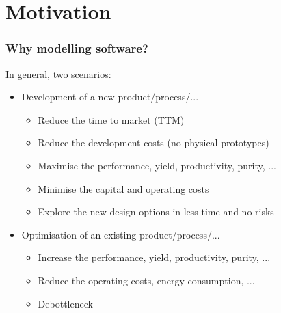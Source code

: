 \documentclass[compress,newPxFont,sthlmFooter]{beamer}
\begin{document}
\section{Motivation}

\begin{frame}
\frametitle{Why modelling software?}
In general, two scenarios:
\begin{itemize}
  \item \alert{Development} of a \alert{new} product/process/...
    \begin{itemize}
        \item Reduce the time to market (TTM)
        \item Reduce the development costs (no physical prototypes)
        \item Maximise the performance, yield, productivity, purity, ...
        \item Minimise the capital and operating costs
        \item Explore the new design options in less time and no risks
    \end{itemize}

  \item \alert{Optimisation} of an \alert{existing} product/process/...
    \begin{itemize}
        \item Increase the performance, yield, productivity, purity, ...
        \item Reduce the operating costs, energy consumption, ...
        \item Debottleneck
    \end{itemize}
\end{itemize}
\end{frame}
\end{document}
